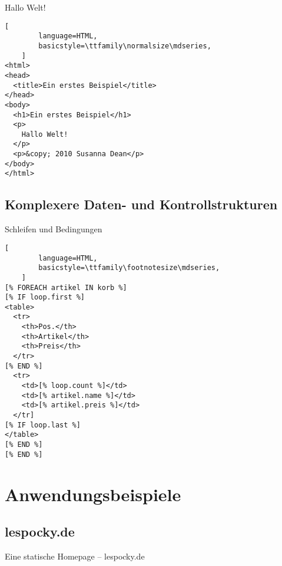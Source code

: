\documentclass[hyperref={pdfpagelabels=false}]{beamer}
\begin{document}
\begin{frame}[fragile]{Hallo Welt!}
    \begin{lstlisting}[
        language=HTML,
        basicstyle=\ttfamily\normalsize\mdseries,
    ]
<html>
<head>
  <title>Ein erstes Beispiel</title>
</head>
<body>
  <h1>Ein erstes Beispiel</h1>
  <p>
    Hallo Welt!
  </p>
  <p>&copy; 2010 Susanna Dean</p>
</body>
</html>
    \end{lstlisting}
\end{frame}

\subsection{Komplexere Daten- und Kontrollstrukturen}

\begin{frame}[fragile]{Schleifen und Bedingungen}
    \begin{lstlisting}[
        language=HTML,
        basicstyle=\ttfamily\footnotesize\mdseries,
    ]
[% FOREACH artikel IN korb %]
[% IF loop.first %]
<table>
  <tr>
    <th>Pos.</th>
    <th>Artikel</th>
    <th>Preis</th>
  </tr>
[% END %]
  <tr>
    <td>[% loop.count %]</td>
    <td>[% artikel.name %]</td>
    <td>[% artikel.preis %]</td>
  </tr]
[% IF loop.last %]
</table>
[% END %]
[% END %]
    \end{lstlisting}
\end{frame}

\section{Anwendungsbeispiele}

\subsection{lespocky.de}

\begin{frame}{Eine statische Homepage -- lespocky.de}
\end{frame}
\end{document}
